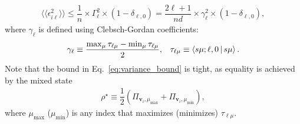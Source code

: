 \documentclass[notitlepage,twocolumn]{revtex4-2}
\renewcommand{\t}{\text} %
\newcommand{\f}[2]{\dfrac{#1}{#2}} %
\newcommand{\p}[1]{\left(#1\right)} %
\newcommand{\bk}{\Braket} %
\renewcommand{\v}{\bm} %
\newcommand{\bbk}[1]{\langle\!\langle #1 \rangle\!\rangle}
\begin{document}
\begin{align}
  \bbk{\epsilon_{i\ell}^2}
  \le \f1n \times \Gamma_\ell^2 \times \p{1 - \delta_{\ell,0}}
  = \f{2\ell+1}{nd} \times \gamma_\ell^2
  \times \p{1 - \delta_{\ell,0}},
  \label{eq:variance_bound}
\end{align}
where $\gamma_\ell$ is defined using Clebsch-Gordan coefficients:
\begin{align}
  \gamma_\ell \equiv \f{\max_\mu\tau_{\ell\mu} - \min_\mu\tau_{\ell\mu}}{2},
  &&
  \tau_{\ell\mu} \equiv \bk{s\mu;\ell,0|s\mu}.
\end{align}
Note that the bound in Eq.~\eqref{eq:variance_bound} is tight, as equality is achieved by the mixed state
\begin{align}
  \rho^\star
  \equiv \f12 \p{\Pi_{\v v_i,\mu_{\t{max}}} + \Pi_{\v v_i,\mu_{\t{min}}}},
\end{align}
where $\mu_{\t{max}}$ ($\mu_{\t{min}}$) is any index that maximizes (minimizes) $\tau_{\ell\mu}$.
\end{document}

